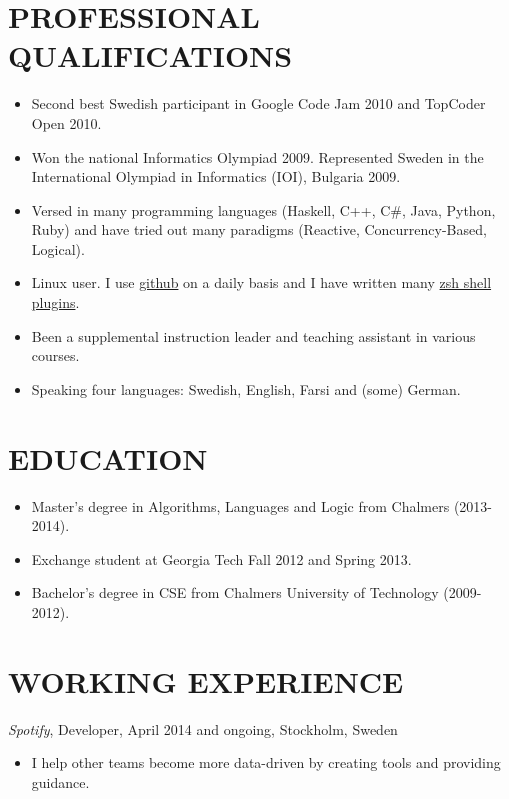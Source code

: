 \documentclass[11pt]{res} %
\begin{document}
\begin{resume}

\section{PROFESSIONAL QUALIFICATIONS}
   \begin{itemize} %
   \item Second best Swedish participant in
    Google Code Jam 2010 and TopCoder Open 2010.
   \item Won the national Informatics Olympiad 2009.
    Represented Sweden in the International Olympiad in Informatics (IOI), Bulgaria 2009.
   \item Versed in many programming languages (Haskell, C++, C\#, Java, Python, Ruby)
    and have tried out many paradigms
    (Reactive, Concurrency-Based, Logical).
   \item Linux user. I use
    \href{https://github.com/Tarrasch}{github} on a daily basis and I have written many
    \href{https://github.com/search?q=\%40Tarrasch+zsh+OR+antigen\&type=Repositories\&ref=searchresults}{zsh shell plugins}.
   \item Been a supplemental instruction leader and teaching assistant in
     various courses.
   \item Speaking four languages: Swedish, English, Farsi and (some) German.
 \end{itemize}

\section{EDUCATION}
 \begin{itemize} %
   \item Master's degree in Algorithms, Languages and Logic from Chalmers
     (2013-2014).
   \item Exchange student at Georgia Tech Fall 2012 and Spring 2013.
   \item Bachelor's degree in CSE from Chalmers University of Technology
     (2009-2012).
 \end{itemize}

\section{WORKING EXPERIENCE}
\emph{Spotify}, {\footnotesize Developer, April 2014 and ongoing}, Stockholm, Sweden
\vspace{0.2in}
   \begin{itemize}
   \item I help other teams become more data-driven by creating tools and
     providing guidance.
 \end{itemize}


\end{resume}
\end{document}
